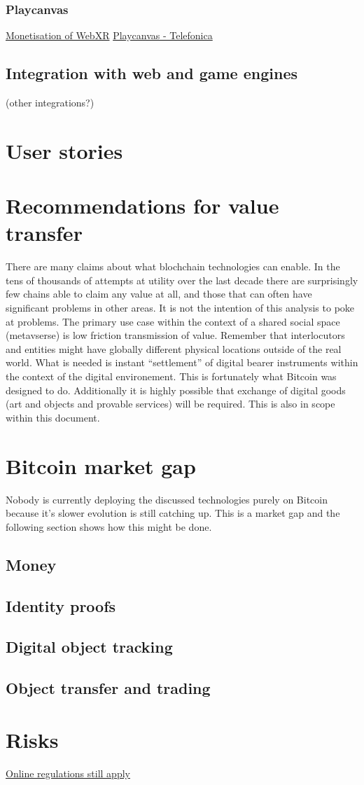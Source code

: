 \subsubsection{Playcanvas}
\href{https://hackmd.io/@XR/monetization}{Monetisation of WebXR}
\href{https://github.com/playcanvas/engine}{Playcanvas - Telefonica}
\subsection{Integration with web and game engines} (other integrations?) 
\section{User stories}
\section{Recommendations for value transfer}
There are many claims about what blochchain technologies can enable. In the tens of thousands of attempts at utility over the last decade there are surprisingly few chains able to claim any value at all, and those that can often have significant problems in other areas. It is not the intention of this analysis to poke at problems. The primary use case within the context of a shared social space (metavserse) is low friction transmission of value. Remember that interlocutors and entities might have globally different physical locations outside of the real world. What is needed is instant ``settlement'' of digital bearer instruments within the context of the digital environement. This is fortunately what Bitcoin was designed to do. Additionally it is highly possible that exchange of digital goods (art and objects and provable services) will be required. This is also in scope within this document.
\section{Bitcoin market gap}
Nobody is currently deploying the discussed technologies purely on Bitcoin because it's slower evolution is still catching up. This is a market gap and the following section shows how this might be done.
\subsection{Money}
\subsection{Identity proofs}
\subsection{Digital object tracking}
\subsection{Object transfer and trading}
\section{Risks}
\href{https://www.carnegieuktrust.org.uk/blog-posts/regulating-the-future-the-online-safety-bill-and-the-metaverse/}{Online regulations still apply}
